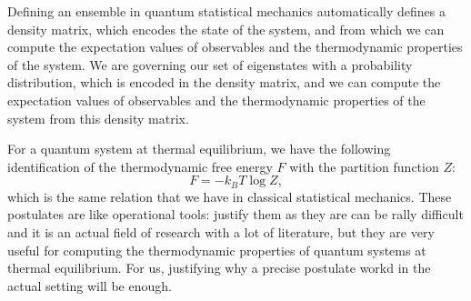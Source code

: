 Defining an ensemble in quantum statistical mechanics automatically defines a density matrix, which encodes the state of the system, and from which we can compute the expectation values of observables and the thermodynamic properties of the system. We are governing our set of eigenstates with a probability distribution, which is encoded in the density matrix, and we can compute the expectation values of observables and the thermodynamic properties of the system from this density matrix.

For a quantum system at thermal equilibrium, we have the following identification of the thermodynamic free energy \(F\) with the partition function \(Z\):
\[
    F = -k_B T \log Z,
\]
which is the same relation that we have in classical statistical mechanics. These postulates are like operational tools: justify them as they are can be rally difficult and it is an actual field of research with a lot of literature, but they are very useful for computing the thermodynamic properties of quantum systems at thermal equilibrium. For us, justifying why a precise postulate workd in the actual setting will be enough.